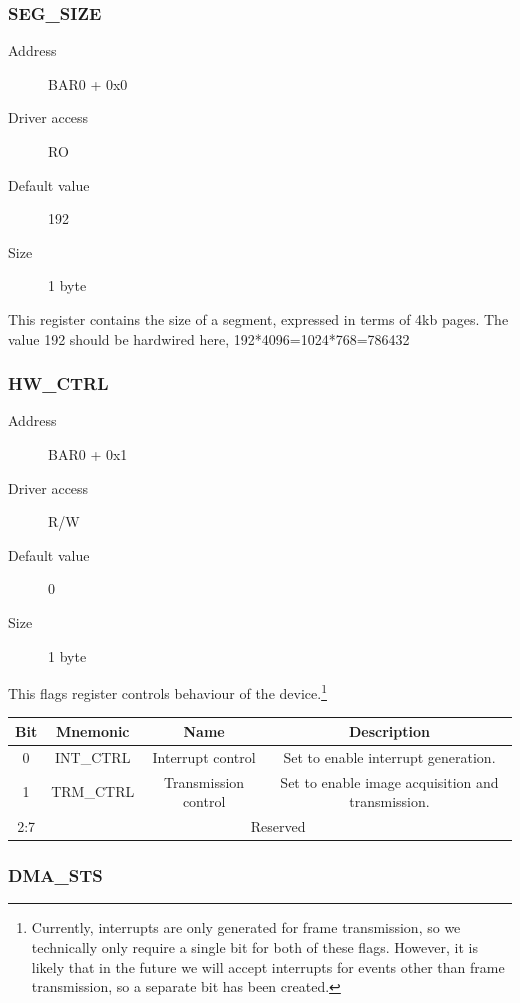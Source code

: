 \documentclass[12pt]{article}
\begin{document}
\subsubsection{SEG\_SIZE}

\begin{description}
\item[Address] BAR0 + 0x0
\item[Driver access] RO
\item[Default value] 192
\item[Size] 1 byte
\end{description}

This register contains the size of a segment, expressed in terms of 4kb pages. The value 192 should be hardwired here, 192*4096=1024*768=786432

\subsubsection{HW\_CTRL}

\begin{description}
\item[Address] BAR0 + 0x1
\item[Driver access] R/W
\item[Default value] 0
\item[Size] 1 byte
\end{description}

This flags register controls behaviour of the device.\footnote{Currently, interrupts are only generated for frame transmission, so we technically only require a single bit for both of these flags. However, it is likely that in the future we will accept interrupts for events other than frame transmission, so a separate bit has been created.}

\begin{tabular}{|c|c|c|c|}\hline
\textbf{Bit} & \textbf{Mnemonic} & \textbf{Name} & \textbf{Description} \\ \hline
0 & INT\_CTRL & Interrupt control & Set to enable interrupt generation. \\ \hline
1 & TRM\_CTRL & Transmission control & Set to enable image acquisition and transmission. \\ \hline
2:7 & \multicolumn{3}{|c|}{Reserved} \\ \hline
\end{tabular}

\subsubsection{DMA\_STS}
\end{document}
